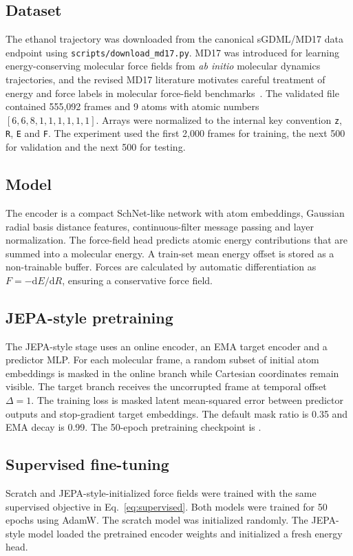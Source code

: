 \documentclass[11pt]{article}
\begin{document}
\subsection*{Dataset}
The ethanol trajectory was downloaded from the canonical sGDML/MD17 data endpoint using \texttt{scripts/download\_md17.py}. MD17 was introduced for learning energy-conserving molecular force fields from \textit{ab initio} molecular dynamics trajectories, and the revised MD17 literature motivates careful treatment of energy and force labels in molecular force-field benchmarks~\cite{chmiela2017gdml, christensen2020gradients}. The validated file contained 555,092 frames and 9 atoms with atomic numbers $[6,6,8,1,1,1,1,1,1]$. Arrays were normalized to the internal key convention \texttt{z}, \texttt{R}, \texttt{E} and \texttt{F}. The experiment used the first 2,000 frames for training, the next 500 for validation and the next 500 for testing.

\subsection*{Model}
The encoder is a compact SchNet-like network with atom embeddings, Gaussian radial basis distance features, continuous-filter message passing and layer normalization. The force-field head predicts atomic energy contributions that are summed into a molecular energy. A train-set mean energy offset is stored as a non-trainable buffer. Forces are calculated by automatic differentiation as $F=-\mathrm{d}E/\mathrm{d}R$, ensuring a conservative force field.

\subsection*{JEPA-style pretraining}
The JEPA-style stage uses an online encoder, an EMA target encoder and a predictor MLP. For each molecular frame, a random subset of initial atom embeddings is masked in the online branch while Cartesian coordinates remain visible. The target branch receives the uncorrupted frame at temporal offset $\Delta=1$. The training loss is masked latent mean-squared error between predictor outputs and stop-gradient target embeddings. The default mask ratio is 0.35 and EMA decay is 0.99. The 50-epoch pretraining checkpoint is .

\subsection*{Supervised fine-tuning}
Scratch and JEPA-style-initialized force fields were trained with the same supervised objective in Eq.~\ref{eq:supervised}. Both models were trained for 50 epochs using AdamW. The scratch model was initialized randomly. The JEPA-style model loaded the pretrained encoder weights and initialized a fresh energy head.
\end{document}
